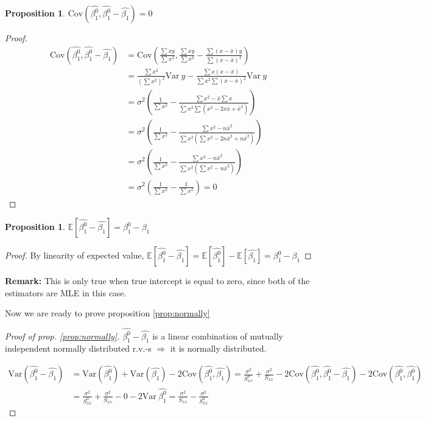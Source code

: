 \documentclass[12pt,a4paper,oneside]{book} %
\newtheorem{proposition}[theorem]{Proposition}
\newcommand{\E}{\mathbb{E}}
\newcommand{\Var}{\mathrm{Var}}
\newcommand{\Cov}{\mathrm{Cov}}
\begin{document}
\begin{proposition}
	$\Cov (\hat{\beta_1^0},\hat{\beta_1^0}-\hat{\beta_1})=0$
\end{proposition}

\begin{proof}
	\begin{align*}
		\Cov (\hat{\beta_1^0},\hat{\beta_1^0}-\hat{\beta_1}) &=
		\Cov (\frac{\sum xy}{\sum x^2},\frac{\sum xy}{\sum x^2}-\frac{\sum (x-\bar{x})y}{\sum (x-\bar{x})^2})  \\
		&= \frac{\sum x^2}{(\sum x^2)^2} \Var\  y - \frac{\sum x(x-\bar{x})}{\sum x^2 \sum (x-\bar{x})^2} \Var \ y \\
		&=\sigma^2(\frac{1}{\sum x^2} - \frac{\sum x^2 - \bar{x}\sum x}{\sum x^2 \sum(x^2-2x\bar{x}+\bar{x}^2)}) \\
		&= \sigma^2 (\frac{1}{\sum x^2}-\frac{\sum x^2 - n \bar{x}^2}{\sum x^2(\sum x^2 - 2n\bar{x}^2+n\bar{x}^2)}) \\
		&=\sigma^2 (\frac{1}{\sum x^2}-\frac{\sum x^2 - n \bar{x}^2}{\sum x^2(\sum x^2 -n\bar{x}^2)}) \\
		&= \sigma^2(\frac{1}{\sum x^2}-\frac{1}{\sum x^2})=0
	\end{align*}
\end{proof}

\begin{proposition}
	$\E [\hat{\beta_1^0}-\hat{\beta_1}]=\beta_1^0-\beta_1$ 
\end{proposition}

\begin{proof}
	By linearity of expected value, $\E [\hat{\beta_1^0}-\hat{\beta_1}]= \E[\hat{\beta_1^0}] - \E[\hat{\beta_1}]= \beta_1^0-\beta_1 $
\end{proof}

\textbf{Remark:} This is only true when true intercept is equal to zero, since both of the estimators are MLE in this case.
	
	Now we are ready to prove proposition \ref{prop:normally}
\begin{proof}[Proof of prop. \ref{prop:normally}]
	$\hat{\beta_1^0}-\hat{\beta_1}$ is a linear combination of mutually independent normally distributed r.v.-s $\Rightarrow$ it is normally distributed.
	
	
	\begin{align*}
		\Var (\hat{\beta_1^0}-\hat{\beta_1})&=\Var(\hat{\beta_1^0}) + \Var(\hat{\beta_1}) - 2 \Cov (\hat{\beta_1^0},\hat{\beta_1}) =\frac{\sigma^2}{S_{xx}^0}+\frac{\sigma^2}{S_{xx}}-2 \Cov (\hat{\beta_1^0},\hat{\beta_1^0}-\hat{\beta_1})-2 \Cov (\hat{\beta_1^0},\hat{\beta_1^0}) \\
		&= \frac{\sigma^2}{S_{xx}^0}+\frac{\sigma^2}{S_{xx}} - 0 -2 \Var \ \hat{\beta_1^0}=\frac{\sigma^2}{S_{xx}}-\frac{\sigma^2}{S_{xx}^0}
	\end{align*}
\end{proof}
	
\end{document}
